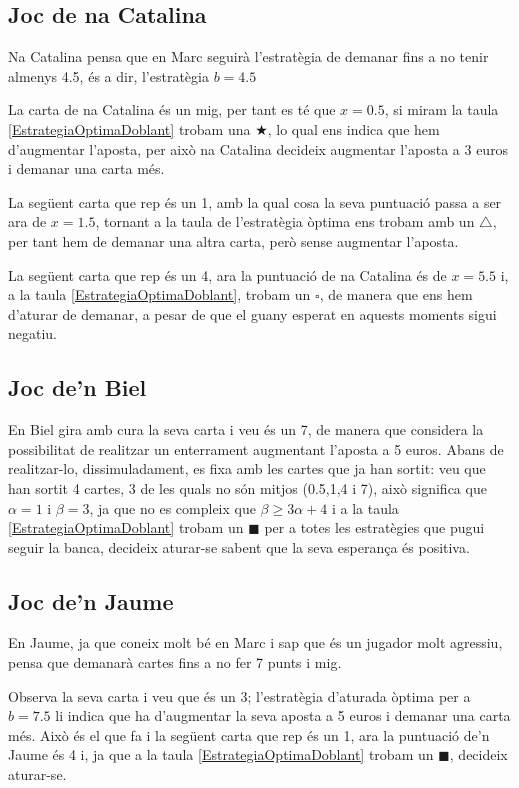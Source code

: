 \documentclass[9pt]{IEEEtran}
\begin{document}
\subsection{Joc de na Catalina}

Na Catalina pensa que en Marc seguirà l'estratègia de demanar fins a no tenir almenys 4.5, és a dir, l'estratègia $b = 4.5$

La carta de na Catalina és un mig, per tant es té que $ x= 0.5$, si miram la taula \ref{EstrategiaOptimaDoblant} trobam una $\bigstar$, lo qual ens indica que hem d'augmentar l'aposta, per això na Catalina decideix augmentar l'aposta a 3 euros i demanar una carta més.

La següent carta que rep és un 1, amb la qual cosa la seva puntuació passa a ser ara de $x= 1.5$, tornant a la taula de l'estratègia òptima ens trobam amb un $\triangle$, per tant hem de demanar una altra carta, però sense augmentar l'aposta.

La següent carta que rep és un 4, ara la puntuació de na Catalina és de $x = 5.5$ i, a la taula \ref{EstrategiaOptimaDoblant}, trobam un $\square$, de manera que ens hem d'aturar de demanar, a pesar de que el guany esperat en aquests moments sigui negatiu.

\subsection{Joc de'n Biel}

En Biel gira amb cura la seva carta i veu és un 7, de manera que considera la possibilitat de realitzar un enterrament augmentant l'aposta a 5 euros. Abans de realitzar-lo, dissimuladament, es fixa amb les cartes que ja han sortit: veu que han sortit 4 cartes, 3 de les quals no són mitjos (0.5,1,4 i 7), això significa que $\alpha = 1$ i $\beta = 3$, ja que no es compleix que $\beta \geq 3\alpha + 4$ i a la taula \ref{EstrategiaOptimaDoblant} trobam un $\blacksquare$ per a totes les estratègies que pugui seguir la banca, decideix aturar-se sabent que la seva esperança és positiva.

\subsection{Joc de'n Jaume}

En Jaume, ja que coneix molt bé en Marc i sap que és un jugador molt agressiu, pensa que demanarà cartes fins a no fer 7 punts i mig.

Observa la seva carta i veu que és un 3; l'estratègia d'aturada òptima per a $b= 7.5$ li indica que ha d'augmentar la seva aposta a 5 euros i demanar una carta més. Això és el que fa i la següent carta que rep és un 1, ara la puntuació de'n Jaume és 4 i, ja que a la taula \ref{EstrategiaOptimaDoblant} trobam un $\blacksquare$, decideix aturar-se.
\end{document}
